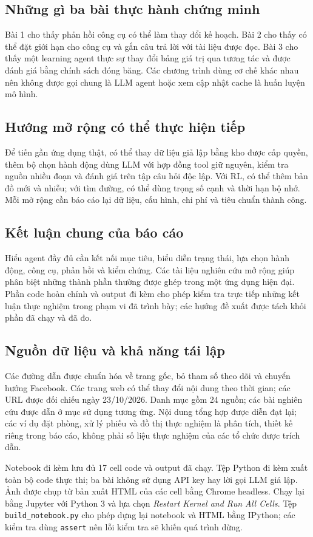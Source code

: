 \subsection{Những gì ba bài thực hành chứng minh}
Bài 1 cho thấy phản hồi công cụ có thể làm thay đổi kế hoạch. Bài 2 cho thấy có thể
đặt giới hạn cho công cụ và gắn câu trả lời với tài liệu được đọc. Bài 3 cho thấy
một learning agent thực sự thay đổi bảng giá trị qua tương tác và được đánh giá
bằng chính sách đóng băng. Các chương trình dùng cơ chế khác nhau nên không được
gọi chung là LLM agent hoặc xem cập nhật cache là huấn luyện mô hình.

\subsection{Hướng mở rộng có thể thực hiện tiếp}
Để tiến gần ứng dụng thật, có thể thay dữ liệu giả lập bằng kho được cấp quyền,
thêm bộ chọn hành động dùng LLM với hợp đồng tool giữ nguyên, kiểm tra nguồn nhiều
đoạn và đánh giá trên tập câu hỏi độc lập. Với RL, có thể thêm bản đồ mới và nhiễu;
với tìm đường, có thể dùng trọng số cạnh và thời hạn bộ nhớ. Mỗi mở rộng cần báo
cáo lại dữ liệu, cấu hình, chi phí và tiêu chuẩn thành công.

\subsection{Kết luận chung của báo cáo}
Hiểu agent đầy đủ cần kết nối mục tiêu, biểu diễn trạng thái, lựa chọn hành động,
công cụ, phản hồi và kiểm chứng. Các tài liệu nghiên cứu mở rộng giúp phân biệt
những thành phần thường được ghép trong một ứng dụng hiện đại. Phần code hoàn chỉnh
và output đi kèm cho phép kiểm tra trực tiếp những kết luận thực nghiệm trong phạm
vi đã trình bày; các hướng đề xuất được tách khỏi phần đã chạy và đã đo.


\subsection{Nguồn dữ liệu và khả năng tái lập}
Các đường dẫn được chuẩn hóa về trang gốc, bỏ tham số theo dõi và chuyển hướng Facebook.
Các trang web có thể thay đổi nội dung theo thời gian; các URL được đối chiếu ngày
23/10/2026. Danh mục gồm 24 nguồn; các bài nghiên cứu được dẫn ở mục sử dụng tương ứng.
Nội dung tổng hợp được diễn đạt lại; các ví dụ đặt phòng,
xử lý phiếu và đồ thị thực nghiệm là phân tích, thiết kế riêng trong báo cáo, không
phải số liệu thực nghiệm của các tổ chức được trích dẫn.

Notebook đi kèm lưu đủ 17 cell code và output đã chạy. Tệp Python đi kèm xuất toàn bộ
code thực thi; ba bài không sử dụng API key hay lời gọi LLM giả lập.
Ảnh được chụp từ bản xuất HTML
của các cell bằng Chrome headless. Chạy lại bằng Jupyter với Python 3 và lựa chọn
\textit{Restart Kernel and Run All Cells}. Tệp \texttt{build\_notebook.py} cho phép dựng
lại notebook và HTML bằng IPython; các kiểm tra dùng \texttt{assert} nên lỗi kiểm tra
sẽ khiến quá trình dừng.
